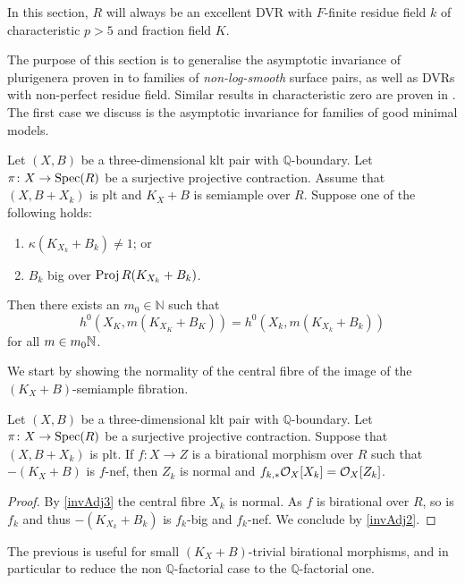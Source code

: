 	
	In this section, $R$ will always be an excellent DVR with $F$-finite residue field $k$ of characteristic $p>5$ and fraction field $K$. 
	
	The purpose of this section is to generalise the asymptotic invariance of plurigenera proven in \cite[Theorem 3.1]{EH} to families of \emph{non-log-smooth} surface pairs, as well as DVRs with non-perfect residue field. Similar results in characteristic zero are proven in \cite{HMX13, HMX18}.
	The first case we discuss is the asymptotic invariance for families of good minimal models.
	\begin{theorem}\label{thm:ADIOP_SA}
		Let $(X,B)$ be a three-dimensional klt pair with $\mathbb{Q}$-boundary.
		Let $\pi \colon X \to\operatorname{Spec} (R)$ be a  surjective projective contraction. Assume that $(X,B+X_k)$ is plt and $K_X+B$ is semiample over $R$.
		Suppose one of the following holds:
		\begin{enumerate}
			\item $\kappa(K_{X_k}+B_k)\neq 1$; or
			\item  $B_k$ big over $\operatorname{Proj} R(K_{X_k}+B_k)$.
		\end{enumerate} 
		Then there exists an $m_{0} \in \mathbb{N}$ such that 
		$$h^0(X_K,m(K_{X_K}+B_K))=h^0(X_k,m(K_{X_k}+B_k))$$
		for all $m\in m_0\mathbb{N}$.
	\end{theorem}
	
	We start by showing the normality of the central fibre of the image of the $(K_X+B)$-semiample fibration.
	
	\begin{proposition}\label{p-gen-case}
		Let $(X,B)$ be a three-dimensional klt pair with $\mathbb{Q}$-boundary.
		Let $\pi \colon X \to\operatorname{Spec} (R)$ be a  surjective projective contraction.
		Suppose that $(X,B+X_{k})$ is plt. If $f \colon X \to Z$ is a birational morphism over $R$ such that $-(K_{X}+B)$ is $f$-nef, then $Z_k$ is normal and $f_{k,*}\mathcal{O}_{X}[X_{k}]=\mathcal{O}_{X}[Z_{k}]$.
	\end{proposition}
	
	\begin{proof}
		By \autoref{invAdj3} the central fibre $X_{k}$ is normal. 
		As $f$ is birational over $R$, so is $f_{k}$ and thus $-(K_{X_{k}}+B_{k})$ is $f_{k}$-big and $f_k$-nef. We conclude by \autoref{invAdj2}.
	\end{proof}
	
	The previous is useful for small $(K_{X}+B)$-trivial birational morphisms, and in particular to reduce the non $\mathbb{Q}$-factorial case to the $\mathbb{Q}$-factorial one.
	
